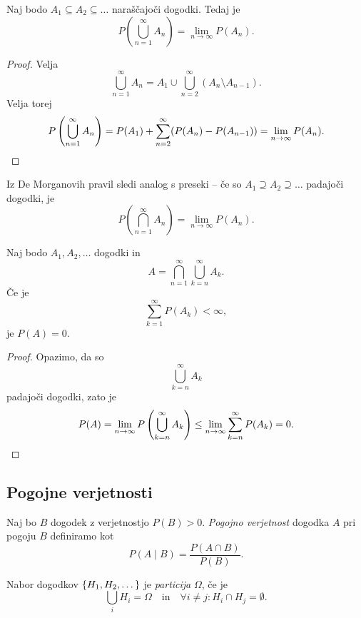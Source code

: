 \begin{izrek}
Naj bodo $A_1 \subseteq A_2 \subseteq \dots$ naraščajoči dogodki.
Tedaj je
\[
P\left(\bigcup_{n=1}^\infty A_n\right) =
\lim_{n \to \infty} P(A_n).
\]
\end{izrek}

\begin{proof}
Velja
\[
\bigcup_{n=1}^\infty A_n =
A_1 \cup \bigcup_{n=2}^\infty (A_n \setminus A_{n-1}).
\]
Velja torej
\[
P\left(\bigcup_{n=1}^\infty A_n\right) =
P(A_1) + \sum_{n=2}^\infty (P(A_n) - P(A_{n-1})) =
\lim_{n \to \infty} P(A_n). \qedhere
\]
\end{proof}

\begin{opomba}
Iz De Morganovih pravil sledi analog s preseki -- če so
$A_1 \supseteq A_2 \supseteq \dots$ padajoči dogodki, je
\[
P\left(\bigcap_{n=1}^\infty A_n\right) =
\lim_{n \to \infty} P(A_n).
\]
\end{opomba}

\begin{izrek}
Naj bodo $A_1, A_2, \dots$ dogodki in
\[
A = \bigcap_{n=1}^\infty \bigcup_{k=n}^\infty A_k.
\]
Če je
\[
\sum_{k=1}^\infty P(A_k) < \infty,
\]
je $P(A) = 0$.
\end{izrek}

\begin{proof}
Opazimo, da so
\[
\bigcup_{k=n}^\infty A_k
\]
padajoči dogodki, zato je
\[
P(A) =
\lim_{n \to \infty} P\left(\bigcup_{k=n}^\infty A_k\right) \leq
\lim_{n \to \infty} \sum_{k=n}^\infty P(A_k) = 0. \qedhere
\]
\end{proof}

\newpage

\subsection{Pogojne verjetnosti}


\begin{definicija}
Naj bo $B$ dogodek z verjetnostjo $P(B) > 0$.
\emph{Pogojno verjetnost}
dogodka $A$ pri pogoju $B$ definiramo kot
\[
P(A \mid B) = \frac{P(A \cap B)}{P(B)}.
\]
\end{definicija}

\begin{definicija}
Nabor dogodkov $\left\{H_1, H_2, \dots\right\}$ je
\emph{particija} $\Omega$, če je
\[
\bigcup_i H_i = \Omega
\quad \text{in} \quad
\forall i \ne j \colon H_i \cap H_j = \emptyset.
\]
\end{definicija}

